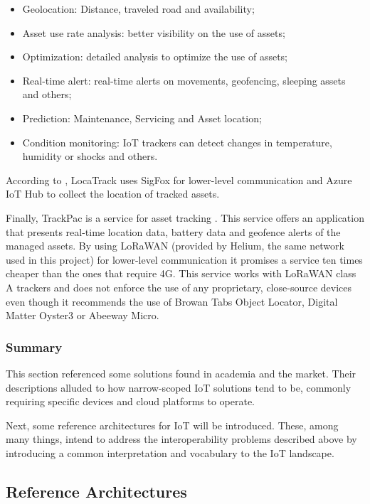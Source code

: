 \begin{itemize}
    \item Geolocation: Distance, traveled road and availability;
    \item Asset use rate analysis: better visibility on the use of assets;
    \item Optimization: detailed analysis to optimize the use of assets;
    \item Real-time alert: real-time alerts on movements, geofencing, sleeping assets and others;
    \item Prediction: Maintenance, Servicing and Asset location;
    \item Condition monitoring: IoT trackers can detect changes in temperature, humidity or shocks and others.
\end{itemize}

According to \cite{safecube-azure}, LocaTrack uses SigFox for lower-level communication and Azure IoT Hub to collect the location of tracked assets.

Finally, TrackPac is a service for asset tracking \parencite{trackpac}. This service offers an application that presents real-time location data, battery data and geofence alerts of the managed assets. By using LoRaWAN (provided by Helium, the same network used in this project) for lower-level communication it promises a service ten times cheaper than the ones that require 4G. This service works with LoRaWAN class A trackers and does not enforce the use of any proprietary, close-source devices even though it recommends the use of Browan Tabs Object Locator, Digital Matter Oyster3 or Abeeway Micro. 

\subsubsection{Summary}
\label{subsubsec:stateofart:arch:solutions:summary}

This section referenced some solutions found in academia and the market. Their descriptions alluded to how narrow-scoped \gls{IoT} solutions tend to be, commonly requiring specific devices and cloud platforms to operate.

Next, some reference architectures for \gls{IoT} will be introduced. These, among many things, intend to address the interoperability problems described above by introducing a common interpretation and vocabulary to the \gls{IoT} landscape.

\subsection{Reference Architectures}
\label{subsec:stateofart:arch:ref}

